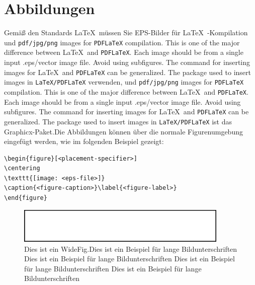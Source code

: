\documentclass[pdflatex,sn-mathphys-num]{sn-jnl}%
\theoremstyle{thmstyleone}%
\theoremstyle{thmstyletwo}%
\theoremstyle{thmstylethree}%
\begin{document}
\section{Abbildungen} \label{sec6}

Gemäß den Standards \LaTeX \ müssen Sie EPS-Bilder für \LaTeX \ -Kompilation und \verb+pdf/jpg/png+ images for \verb+PDFLaTeX+ compilation. This is one of the major difference between \LaTeX\ and \verb+PDFLaTeX+. Each image should be from a single input .eps/vector image file. Avoid using subfigures. The command for inserting images for \LaTeX\ and \verb+PDFLaTeX+ can be generalized. The package used to insert images in \verb+LaTeX/PDFLaTeX+ verwenden, und \verb+pdf/jpg/png+ images for \verb+PDFLaTeX+ compilation. This is one of the major difference between \LaTeX\ and \verb+PDFLaTeX+. Each image should be from a single input .eps/vector image file. Avoid using subfigures. The command for inserting images for \LaTeX\ and \verb+PDFLaTeX+ can be generalized. The package used to insert images in \verb+LaTeX/PDFLaTeX+ ist das Graphicx-Paket.Die Abbildungen können über die normale Figurenumgebung eingefügt werden, wie im folgenden Beispiel gezeigt:

\bigskip
\begin{verbatim}
\begin{figure}[<placement-specifier>]
\centering
\texttt{[image: <eps-file>]}
\caption{<figure-caption>}\label{<figure-label>}
\end{figure}
\end{verbatim}
\bigskip

\begin{figure}[h]
\centering
\includegraphics[width=0.9\textwidth]{fig.eps}
\caption{Dies ist ein WideFig.Dies ist ein Beispiel für lange Bildunterschriften Dies ist ein Beispiel für lange Bildunterschriften Dies ist ein Beispiel für lange Bildunterschriften Dies ist ein Beispiel für lange Bildunterschriften} \label{fig1}
\end{figure}
\end{document}
